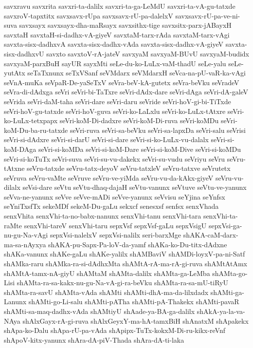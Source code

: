 {savxravu
savxrita
savxri-ta-dalilx
savxri-ta-ga-LeMdU
savxri-ta-vA-gu-tatxde
savxroV-tapxtitx
savxsavx-rUpa
savxsavx-rU-pa-dalelxV
savxsavx-rU-pa-ve-ni-suva
savxsayx
savxsayx-dha-maRsayx
savxsithx-tige
savxsitx-parx-jABayxH
savxtaH
savxtaH-si-dadhx-vA-giyeV
savxtaM-tarx-rAda
savxtaM-tarx-vAgi
savxta-sisx-dadhxvA
savxta-sisx-dadhx-vAda
savxta-sisx-dadhx-vA-giyeV
savxta-sisx-dadhxvU
savxto
savxtoV-rA-jateV
savxyaM
savxyaM-BUvU
savxyaM-budidx
savxyaM-parxBuH
sayUR
sayxMti
seLe-du-ko-LuLx-vaM-thadU
seLe-yalu
seLe-yutAtx
seTaTxnunx
seTxVSanf
seVMdarx
seVMdarxH
seVca-na-pU-vaR-ka-vAgi
seVnA-muKa
seVpaR-De-yaSeTxV
seVra-beV-kA-gutetx
seVra-beVku
seVradeV
seVra-di-dAdxga
seVri
seVri-bi-TaTxre
seVri-dAdx-dare
seVri-dAga
seVri-dA-galeV
seVrida
seVri-daM-taha
seVri-dare
seVri-daru
seVride
seVri-hoV-gi-bi-TiTxde
seVri-hoV-gu-tatxde
seVri-hoV-guva
seVri-ko-LaLxlu
seVri-ko-LuLx-tAtxre
seVri-ko-LuLx-tetxpapx
seVri-koM-Di-dadxre
seVri-koM-Di-ruva
seVri-koMDu
seVri-koM-Du-ba-ru-tatxde
seVri-ruva
seVri-sa-beVku
seVri-sa-lapxDa
seVri-salu
seVrisi
seVri-si-dAdxre
seVri-si-darU
seVri-si-dare
seVri-si-ko-LuLx-vu-dalalx
seVri-si-koM-DAga
seVri-si-koMDa
seVri-si-koM-Dare
seVri-si-koM-Dive
seVri-si-koMDu
seVri-si-koTuTx
seVri-suva
seVri-su-vu-dakekx
seVri-su-vudu
seVriyu
seVru
seVru-tAtxne
seVru-tatxde
seVru-tatx-deyoV
seVru-tatxleV
seVru-tatxve
seVrutetx
seVruva
seVru-vaMte
seVruve
seVru-ve-yiMda
seVru-vu-da-kAkx-giyeV
seVru-vu-dilalx
seVsi-dare
seVtu
seVtu-dhaq-dajaH
seVtu-vanunx
seVtuve
seVtu-ve-yanunx
seVva-ne-yanunx
seVve
seVve-mADi
seVve-yanunx
seVvisu
seYjina
seYnfsx
seYniTxsfTx
sekeMDf
sekeM-Du-gaLu
sekxcf
senesxsf
senfsx
senxVhada
senxVhita
senxVhi-ta-no-babx-nanunx
senxVhi-tanu
senxVhi-tara
senxVhi-ta-raMte
senxVhi-tareV
senxVhi-taru
sepxVsf
sepxVsf-gaLu
sepxVsigU
sepxVsi-ga-nu-gu-Na-vAgi
sepxVsi-nalelxV
sepxVsi-nalilx
seri-barxMge
shAKA-caM-darx-ma-sa-nAyxya
shAKA-pu-Sapx-Pa-loV-da-yamf
shAKa-ko-Du-titx-dAdxne
shAKa-vanunx
shAKe-gaLu
shAKe-yalilx
shAMBaviV
shAMDi-loyxV-pa-ni-Satf
shAMka-raru
shAMka-ra-si-dAdhxMta
shAMtA-rA-ma-rA-gi-ruva
shAMtAtAmx
shAMtA-tamx-nA-giyU
shAMtaM
shAMta-dalilx
shAMta-ga-LeMba
shAMta-go-Lisi
shAMta-ra-sa-kakx-nu-gu-Na-vA-gi-ra-beVku
shAMta-ra-sa-mU-tiRyU
shAMta-ra-savU
shAMta-vAda
shAMti
shAMti-dhA-ma-da-lilxdadx
shAMti-ga-Lanunx
shAMti-go-Li-salu
shAMti-pATha
shAMti-pA-Thakekx
shAMti-pavaR
shAMti-sa-maq-dadhx-vAda
shAMtiyU
shAade-ya-BA-ga-dalilx
shAkA-ya-la-va-NAya
shAlxGayx-rA-gi-ruva
shAlxGeyxY-ma-hA-tamxBiH
shAnatxM
shApakekx
shApa-ko-Dalu
shApa-rU-pa-vAda
shApipx-TuTx-kokxM-Di-ru-kikx-reVnf
shApoV-kitx-yanunx
shAra-dA-piV-Thada
shAra-dA-ti-laka
}
